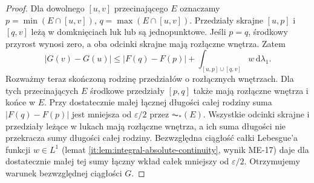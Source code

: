 \begin{proof}
Dla dowolnego $[u,v]$ przecinającego $E$ oznaczamy $p=\min(E\cap[u,v])$, $q=\max(E\cap[u,v])$. Przedziały skrajne $[u,p]$ i $[q,v]$ leżą w domknięciach luk lub są jednopunktowe. Jeśli $p=q$, środkowy przyrost wynosi zero, a oba odcinki skrajne mają rozłączne wnętrza. Zatem
\[
 |G(v)-G(u)|\le |F(q)-F(p)|
       +\int_{[u,p]\cup[q,v]} w\,\mathrm d\lambda_1.
\]
Rozważmy teraz skończoną rodzinę przedziałów o rozłącznych wnętrzach. Dla tych przecinających $E$ środkowe przedziały $[p,q]$ także mają rozłączne wnętrza i końce w $E$. Przy dostatecznie małej łącznej długości całej rodziny suma $|F(q)-F(p)|$ jest mniejsza od $\varepsilon/2$ przez $\AC_*(E)$. Wszystkie odcinki skrajne i przedziały leżące w lukach mają rozłączne wnętrza, a ich suma długości nie przekracza sumy długości całej rodziny. Bezwzględna ciągłość całki Lebesgue'a funkcji $w\in L^1$ (lemat \ref{it:lem:integral-absolute-continuity}, wynik ME-17) daje dla dostatecznie małej tej sumy łączny wkład całek mniejszy od $\varepsilon/2$. Otrzymujemy warunek bezwzględnej ciągłości $G$.
\end{proof}

